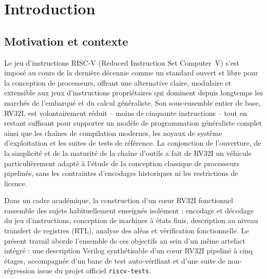 \documentclass[11pt,a4paper,oneside]{report}
\begin{document}
\chapter{Introduction}
\label{ch:intro}

\section{Motivation et contexte}
Le jeu d'instructions RISC-V (Reduced Instruction Set Computer~V)
s'est imposé au cours de la dernière décennie comme un standard
ouvert et libre pour la conception de processeurs, offrant une
alternative claire, modulaire et extensible aux jeux d'instructions
propriétaires qui dominent depuis longtemps les marchés de
l'embarqué et du calcul généraliste. Son sous-ensemble entier de
base, RV32I, est volontairement réduit -- moins de cinquante
instructions -- tout en restant suffisant pour supporter un modèle
de programmation généraliste complet ainsi que les chaînes de
compilation modernes, les noyaux de système d'exploitation et les
suites de tests de référence. La conjonction de l'ouverture, de la
simplicité et de la maturité de la chaîne d'outils a fait de RV32I
un véhicule particulièrement adapté à l'étude de la conception
classique de processeurs pipelinés, sans les contraintes
d'encodages historiques ni les restrictions de licence.

Dans un cadre académique, la construction d'un c\oe{}ur RV32I
fonctionnel rassemble des sujets habituellement enseignés
isolément : encodage et décodage du jeu d'instructions, conception
de machines à états finis, description au niveau transfert de
registres (RTL), analyse des aléas et vérification fonctionnelle.
Le présent travail aborde l'ensemble de ces objectifs au sein
d'un même artefact intégré : une description Verilog synthétisable
d'un c\oe{}ur RV32I pipeliné à cinq étages, accompagnée d'un banc de
test auto-vérifiant et d'une suite de non-régression issue du
projet officiel \texttt{riscv-tests}.
\end{document}
